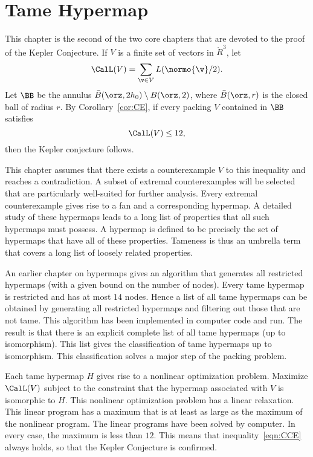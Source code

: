 

\chapter{Tame Hypermap}
%

\label{sec:tame}
%

\begin{summary}
  This chapter is the second of the two core chapters that are devoted
  to the proof of the Kepler Conjecture.  If $V$ is a finite set of
  vectors in $\ring{R}^3$, let
  \begin{displaymath}\CalL(V) = \sum_{\v\in V}
    L(\normo{\v}/2).\end{displaymath}
Let $\BB$ be the
annulus $\bar B(\orz,2h_0)\setminus B(\orz,2)$, where
$\bar B(\orz,r)$ is the closed ball of radius $r$.
By Corollary~\ref{cor:CE}, if every packing $V$
contained in $\BB$
satisfies
\begin{equation}\label{eqn:CCE}
\CalL(V) \le 12,
\end{equation}
then the Kepler conjecture follows.

This chapter assumes that there exists a counterexample $V$ to this
inequality and reaches a contradiction.  A subset of extremal
counterexamples will be selected that are particularly well-suited for
further analysis.  Every extremal counterexample gives rise to a fan
and a corresponding hypermap.  A detailed study of these hypermaps
leads to a long list of properties that all such hypermaps must
possess.  A  hypermap is defined to be precisely the set
of hypermaps that have all of these properties.  Tameness is thus an
umbrella term that covers a long list of loosely related properties.

An earlier chapter on hypermaps gives an algorithm that generates all
restricted hypermaps (with a given bound on the number of nodes).
Every tame hypermap is restricted and has at most $14$ nodes.  Hence a
list of all tame hypermaps can be obtained by generating all
restricted hypermaps and filtering out those that are not tame.  This
algorithm has been implemented in computer code and run.  The result
is that there is an explicit complete list of all tame hypermaps (up
to isomorphism).  This list gives the classification of tame hypermaps
up to isomorphism.  This classification solves a major step of the
packing problem.

Each tame hypermap $H$ gives rise to a nonlinear optimization problem.
Maximize $\CalL(V)$ subject to the constraint that the hypermap
associated with $V$ is isomorphic to $H$.  This nonlinear optimization
problem has a linear relaxation.  This linear program has a maximum
that is at least as large as the maximum of the nonlinear program.
The linear programs have been solved by computer.  In every case, the
maximum is less than $12$.  This means that inequality~\ref{eqn:CCE}
always holds, so that the Kepler Conjecture is confirmed.
\end{summary}
%
%



